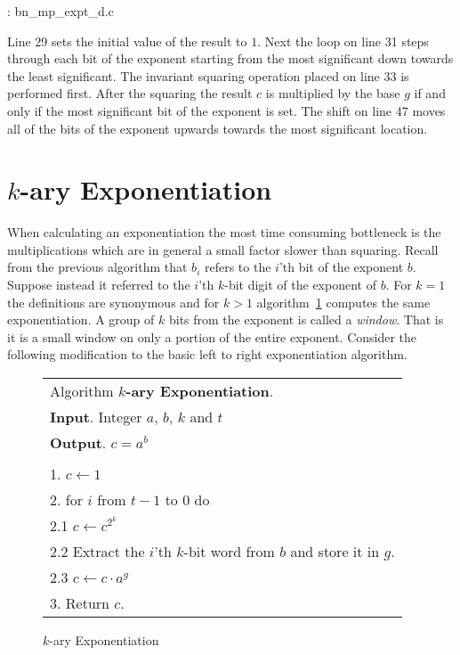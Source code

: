 \documentclass[b5paper]{book}
\begin{document}
\vspace{+3mm}\begin{small}
\hspace{-5.1mm}{\bf File}: bn\_mp\_expt\_d.c
\vspace{-3mm}
\begin{alltt}
\end{alltt}
\end{small}

Line 29 sets the initial value of the result to $1$.  Next the loop on line 31 steps through each bit of the exponent starting from
the most significant down towards the least significant. The invariant squaring operation placed on line 33 is performed first.  After 
the squaring the result $c$ is multiplied by the base $g$ if and only if the most significant bit of the exponent is set.  The shift on line
47 moves all of the bits of the exponent upwards towards the most significant location.  

\section{$k$-ary Exponentiation}
When calculating an exponentiation the most time consuming bottleneck is the multiplications which are in general a small factor
slower than squaring.  Recall from the previous algorithm that $b_{i}$ refers to the $i$'th bit of the exponent $b$.  Suppose instead it referred to
the $i$'th $k$-bit digit of the exponent of $b$.  For $k = 1$ the definitions are synonymous and for $k > 1$ algorithm~\ref{fig:KARY}
computes the same exponentiation.  A group of $k$ bits from the exponent is called a \textit{window}.  That is it is a small window on only a
portion of the entire exponent.  Consider the following modification to the basic left to right exponentiation algorithm.

\begin{figure}[!here]
\begin{small}
\begin{center}
\begin{tabular}{l}
\hline Algorithm \textbf{$k$-ary Exponentiation}. \\
\textbf{Input}.   Integer $a$, $b$, $k$ and $t$ \\
\textbf{Output}.  $c = a^b$ \\
\hline \\
1.  $c \leftarrow 1$ \\
2.  for $i$ from $t - 1$ to $0$ do \\
\hspace{3mm}2.1  $c \leftarrow c^{2^k} $ \\
\hspace{3mm}2.2  Extract the $i$'th $k$-bit word from $b$ and store it in $g$. \\
\hspace{3mm}2.3  $c \leftarrow c \cdot a^g$ \\
3.  Return $c$. \\
\hline
\end{tabular}
\end{center}
\end{small}
\caption{$k$-ary Exponentiation}
\label{fig:KARY}
\end{figure}
\end{document}

